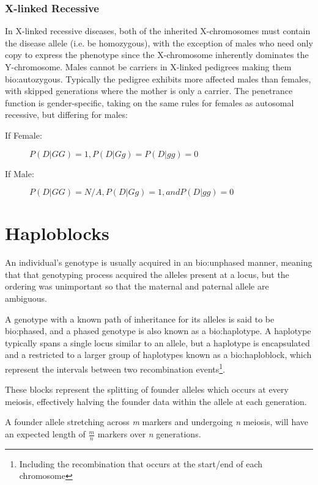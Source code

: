 \subsubsection{X-linked Recessive}

\label{ref:back:xlinkrec}

In X-linked recessive diseases, both of the inherited X-chromosomes must contain the disease allele (i.e. be homozygous), with the exception of males who need only copy to express the phenotype since the X-chromosome inherently dominates the Y-chromosome.  Males cannot be carriers in X-linked pedigrees making them \gls{bio:autozygous}.
Typically the pedigree exhibits more affected males than females, with skipped generations where the mother is only a carrier. 
The penetrance function is gender-specific, taking on the same rules for females as autosomal recessive, but differing for males:

\begin{description}
\item[If Female:]{\(P(D|GG)=1, P(D|Gg) = P(D|gg)=0\)}
\item[If Male:]{\(P(D|GG)=N/A,   P(D|Gg)=1, and P(D|gg)=0\)}
\end{description}


\section{Haploblocks}

An individual's genotype is usually acquired in an \gls{bio:unphased} manner, meaning that that genotyping process acquired the alleles present at a locus, but the ordering was unimportant so that the maternal and paternal allele are ambiguous.

A genotype with a known path of inheritance for its alleles is said to be \gls{bio:phased}, and a phased genotype is also known as a \gls{bio:haplotype}.  A haplotype typically spans a single locus similar to an allele, but a haplotype is encapsulated and a restricted to a larger group of haplotypes known as a \gls{bio:haploblock}, which represent the intervals between two recombination events\footnote{Including the recombination that occurs at the start/end of each chromosome}.

These blocks represent the splitting of founder alleles which occurs at every meiosis, effectively halving the founder data within the allele at each generation. 

A founder allele stretching across \textit{m} markers and undergoing \textit{n} meiosis, will have an expected length of \(\frac{m}{n}\) markers over \textit{n} generations.

